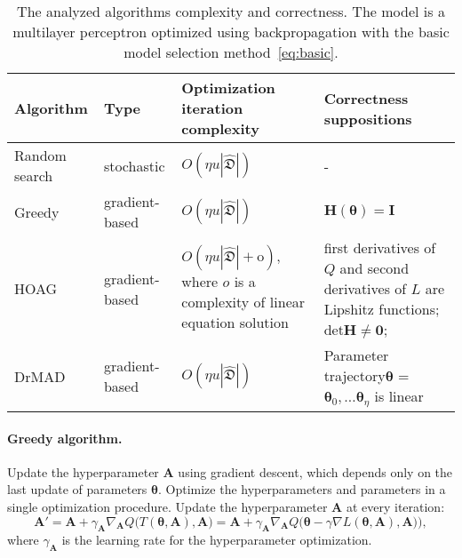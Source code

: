 \documentclass[smallextended]{svjour3}
\begin{document}
\begin{table}
\small


\begin{tabularx}{\textwidth}{|X|X|X|X|}
\hline
\bf Algorithm & \bf Type & \bf Optimization iteration complexity & \bf Correctness suppositions  \\ 
\hline
Random search & stochastic & $O(\eta u |\hat{\mathfrak{D}}|)$& -  \\ \hline
Greedy~\cite{hyper_greed} & gradient-based & $O(\eta u |\hat{\mathfrak{D}}|)$ & $\mathbf{H}(\boldsymbol{\theta}) = \mathbf{I}$  \\ \hline
HOAG~\cite{hyper_hoag} & gradient-based & $O(\eta u |\hat{\mathfrak{D}}| + \text{o}),$ where $o$ is a complexity of linear equation solution& first derivatives of $Q$  and second derivatives of $L$ are Lipshitz functions;  $\text{det}\mathbf{H} \neq \mathbf{0}$;  \\ \hline
DrMAD~\cite{hyper_mad} & gradient-based &$O(\eta u |\hat{\mathfrak{D}}|)$ & Parameter trajectory$\boldsymbol{\theta}$ = $\boldsymbol{\theta}_0, \dots \boldsymbol{\theta}_\eta$  is linear \\ \hline
\end{tabularx}

\caption{The analyzed algorithms complexity and correctness. The model is a multilayer perceptron optimized using backpropagation with the basic model selection method~\eqref{eq:basic}.}
\label{table:algo_descr2}

\end{table}


\paragraph{Greedy algorithm.}
Update the hyperparameter $\mathbf{A}$ using gradient descent, which depends only on the last update of parameters $\boldsymbol{\theta}$. Optimize the hyperparameters and parameters in a single optimization procedure. Update the hyperparameter $\mathbf{A}$ at every iteration:
\[
	\mathbf{A}' = \mathbf{A} + \gamma_{\mathbf{A}} \nabla_{\mathbf{A}}  Q \bigl(T(\boldsymbol{\theta}, \mathbf{A}) , \mathbf{A}\bigr) = \mathbf{A} + \gamma_{\mathbf{A}} \nabla_{\mathbf{A}}  Q\bigl(\boldsymbol{\theta} - \gamma \nabla L(\boldsymbol{\theta}, \mathbf{A}), \mathbf{A})\bigr),
\]
where $\gamma_{\mathbf{A}}$ is the learning rate for the hyperparameter optimization.
\end{document}
